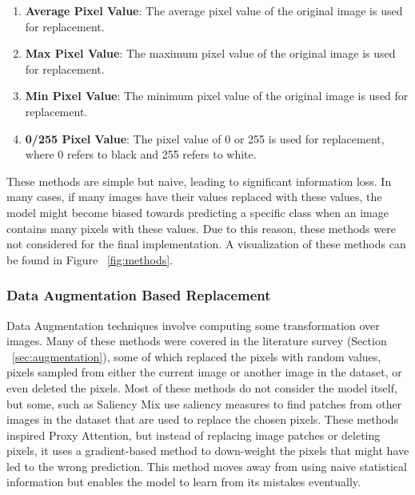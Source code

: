 \begin{enumerate}
    \item \textbf{Average Pixel Value}: The average pixel value of the original image is used for replacement.
    \item \textbf{Max Pixel Value}: The maximum pixel value of the original image is used for replacement.
    \item \textbf{Min Pixel Value}: The minimum pixel value of the original image is used for replacement.
    \item \textbf{0/255 Pixel Value}: The pixel value of 0 or 255 is used for replacement, where 0 refers to black and 255 refers to white.
\end{enumerate}
These methods are simple but naive, leading to significant information loss. In many cases, if many images have their values replaced with these values, the model might become biased towards predicting a specific class when an image contains many pixels with these values.
Due to this reason, these methods were not considered for the final implementation. A visualization of these methods can be found in Figure ~\ref{fig:methods}.

\subsubsection{Data Augmentation Based Replacement}
Data Augmentation techniques involve computing some transformation over images. Many of these methods were covered in the literature survey (Section ~\ref{sec:augmentation}), some of which replaced the pixels with random values, pixels sampled from either the current image or another image in the dataset, or even deleted the pixels. Most of these methods do not consider the model itself, but some, such as Saliency Mix \cite{uddinSaliencyMixSaliencyGuided2021} use saliency measures to find patches from other images in the dataset that are used to replace the chosen pixels.
These methods inspired Proxy Attention, but instead of replacing image patches or deleting pixels, it uses a gradient-based method to down-weight the pixels that might have led to the wrong prediction. This method moves away from using naive statistical information but enables the model to learn from its mistakes eventually.

\subsubsection{}



